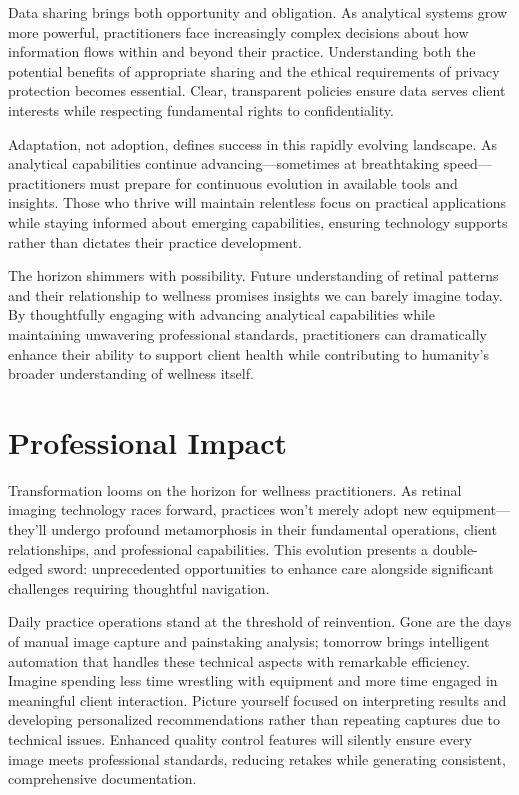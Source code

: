 \documentclass[
  Letterpaper,
]{scrbook}
\begin{document}
Data sharing brings both opportunity and obligation. As analytical
systems grow more powerful, practitioners face increasingly complex
decisions about how information flows within and beyond their practice.
Understanding both the potential benefits of appropriate sharing and the
ethical requirements of privacy protection becomes essential. Clear,
transparent policies ensure data serves client interests while
respecting fundamental rights to confidentiality.

Adaptation, not adoption, defines success in this rapidly evolving
landscape. As analytical capabilities continue advancing---sometimes at
breathtaking speed---practitioners must prepare for continuous evolution
in available tools and insights. Those who thrive will maintain
relentless focus on practical applications while staying informed about
emerging capabilities, ensuring technology supports rather than dictates
their practice development.

The horizon shimmers with possibility. Future understanding of retinal
patterns and their relationship to wellness promises insights we can
barely imagine today. By thoughtfully engaging with advancing analytical
capabilities while maintaining unwavering professional standards,
practitioners can dramatically enhance their ability to support client
health while contributing to humanity's broader understanding of
wellness itself.

\section{Professional Impact}\label{professional-impact}

Transformation looms on the horizon for wellness practitioners. As
retinal imaging technology races forward, practices won't merely adopt
new equipment---they'll undergo profound metamorphosis in their
fundamental operations, client relationships, and professional
capabilities. This evolution presents a double-edged sword:
unprecedented opportunities to enhance care alongside significant
challenges requiring thoughtful navigation.

Daily practice operations stand at the threshold of reinvention. Gone
are the days of manual image capture and painstaking analysis; tomorrow
brings intelligent automation that handles these technical aspects with
remarkable efficiency. Imagine spending less time wrestling with
equipment and more time engaged in meaningful client interaction.
Picture yourself focused on interpreting results and developing
personalized recommendations rather than repeating captures due to
technical issues. Enhanced quality control features will silently ensure
every image meets professional standards, reducing retakes while
generating consistent, comprehensive documentation.
\end{document}
